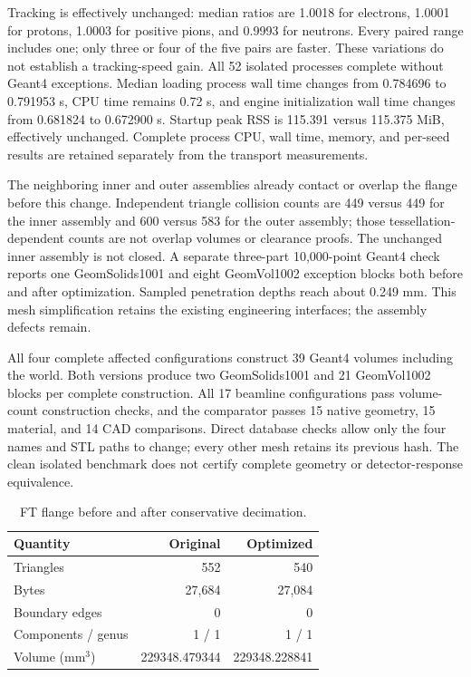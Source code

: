 Tracking is effectively unchanged: median ratios are 1.0018 for electrons, 1.0001 for protons, 1.0003 for
positive pions, and 0.9993 for neutrons. Every paired range includes one; only three or four of the five pairs
are faster. These variations do not establish a tracking-speed gain. All 52 isolated processes complete
without Geant4 exceptions. Median loading process wall time changes from 0.784696 to 0.791953 s, CPU time
remains 0.72 s, and engine initialization wall time changes from 0.681824 to 0.672900 s. Startup peak RSS is
115.391 versus 115.375 MiB, effectively unchanged. Complete process CPU, wall time, memory, and per-seed
results are retained separately from the transport measurements.

The neighboring inner and outer assemblies already contact or overlap the flange before this change.
Independent triangle collision counts are 449 versus 449 for the inner assembly and 600 versus 583 for the
outer assembly; those tessellation-dependent counts are not overlap volumes or clearance proofs. The unchanged
inner assembly is not closed. A separate three-part 10,000-point Geant4 check reports one GeomSolids1001 and
eight GeomVol1002 exception blocks both before and after optimization. Sampled penetration depths reach about
0.249 mm. This mesh simplification retains the existing engineering interfaces; the assembly defects remain.

All four complete affected configurations construct 39 Geant4 volumes including the world. Both versions
produce two GeomSolids1001 and 21 GeomVol1002 blocks per complete construction. All 17 beamline configurations
pass volume-count construction checks, and the comparator passes 15 native geometry, 15 material, and 14 CAD
comparisons. Direct database checks allow only the four names and STL paths to change; every other mesh
retains its previous hash. The clean isolated benchmark does not certify complete geometry or
detector-response equivalence.

\begin{table}[htbp]
\centering
\caption{FT flange before and after conservative decimation.}
\label{tab:ft-flange-mesh}
\setlength{\tabcolsep}{6pt}
\begin{tabular}{lrr}
\toprule
Quantity & Original & Optimized \\
\midrule
Triangles & 552 & 540 \\
Bytes & 27,684 & 27,084 \\
Boundary edges & 0 & 0 \\
Components / genus & 1 / 1 & 1 / 1 \\
Volume (mm$^3$) & 229348.479344 & 229348.228841 \\
\bottomrule
\end{tabular}
\end{table}

